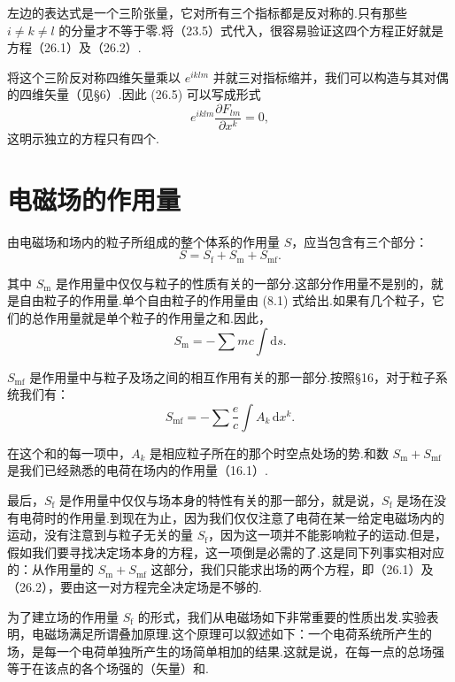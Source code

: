 左边的表达式是一个三阶张量，它对所有三个指标都是反对称的.只有那些 $i\neq k\neq l$
的分量才不等于零.将（23.5）式代入，很容易验证这四个方程正好就是方程（26.1）及（26.2）.

将这个三阶反对称四维矢量乘以 $e^{iklm}$ 并就三对指标缩并，我们可以构造与其对偶的四维矢量（见§6）.因此
(26.5) 可以写成形式
\begin{equation}
  e^{iklm}\frac{\partial F_{lm}}{\partial x^k}=0,
\end{equation}
这明示独立的方程只有四个.

\section{电磁场的作用量}

由电磁场和场内的粒子所组成的整个体系的作用量 $S$，应当包含有三个部分：
\begin{equation}
  S=S_{\mathrm{f}}+S_{\mathrm{m}}+S_{\mathrm{mf}}.
\end{equation}

其中 $S_{\mathrm{m}}$ 是作用量中仅仅与粒子的性质有关的一部分.这部分作用量不是别的，就是自由粒子的作用量.单个自由粒子的作用量由
(8.1) 式给出.如果有几个粒子，它们的总作用量就是单个粒子的作用量之和.因此，
\begin{equation}
  S_{\mathrm{m}}=-\sum mc\int\mathrm{d}s.
\end{equation}

$S_{\mathrm{mf}}$ 是作用量中与粒子及场之间的相互作用有关的那一部分.按照§16，对于粒子系统我们有：
\begin{equation}
  S_{\mathrm{mf}}=-\sum\frac{e}{c}\int A_k\,\mathrm{d}x^k.
\end{equation}

在这个和的每一项中，$A_k$ 是相应粒子所在的那个时空点处场的势.和数 $S_{\mathrm{m}}+S_{\mathrm{mf}}$
是我们已经熟悉的电荷在场内的作用量（16.1）.

最后，$S_{\mathrm{f}}$
是作用量中仅仅与场本身的特性有关的那一部分，就是说，$S_{\mathrm{f}}$
是场在没有电荷时的作用量.到现在为止，因为我们仅仅注意了电荷在某一给定电磁场内的运动，没有注意到与粒子无关的量
$S_{\mathrm{f}}$，因为这一项并不能影响粒子的运动.但是，假如我们要寻找决定场本身的方程，这一项倒是必需的了.这是同下列事实相对应的：从作用量的
$S_{\mathrm{m}}+S_{\mathrm{mf}}$ 这部分，我们只能求出场的两个方程，即（26.1）及（26.2），要由这一对方程完全决定场是不够的.

为了建立场的作用量 $S_{\mathrm{f}}$
的形式，我们从电磁场如下非常重要的性质出发.实验表明，电磁场满足所谓叠加原理.这个原理可以叙述如下：一个电荷系统所产生的场，是每一个电荷单独所产生的场简单相加的结果.这就是说，在每一点的总场强等于在该点的各个场强的（矢量）和.


